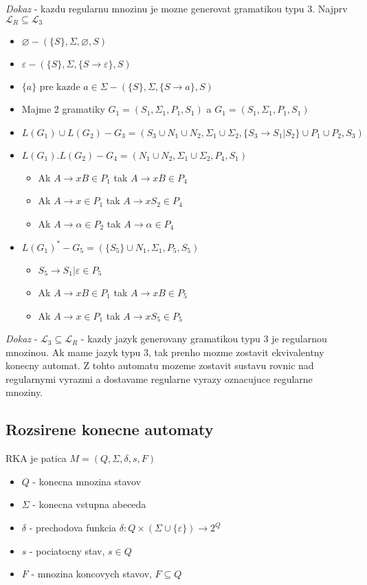 \documentclass[12pt]{article}
\begin{document}
\emph{Dokaz} - kazdu regularnu mnozinu je mozne generovat gramatikou typu 3. Najprv $\mathcal{L}_{R} \subseteq \mathcal{L}_{3}$
\begin{itemize}
	\item $\varnothing - (\{S\},\Sigma,\varnothing,S)$
	\item $\varepsilon - (\{S\},\Sigma,\{S \to \varepsilon\},S)$
	\item $\{a\}\text{ pre kazde }a \in \Sigma - (\{S\},\Sigma,\{S \to a\},S)$
	\item Majme 2 gramatiky $G_{1} = (S_{1}, \Sigma_{1}, P_{1}, S_{1})$ a $G_{1} = (S_{1}, \Sigma_{1}, P_{1}, S_{1})$
	\item $L(G_{1}) \cup L(G_{2}) - G_{3} = (S_{3} \cup N_{1} \cup N_{2}, \Sigma_{1} \cup \Sigma_{2}, \{S_{3} \to S_{1} | S_{2}\} \cup P_{1} \cup P_{2}, S_{3})$
	\item $L(G_{1}).L(G_{2}) - G_{4} = (N_{1} \cup N_{2}, \Sigma_{1} \cup \Sigma_{2}, P_{4}, S_{1})$
		\begin{itemize}
			\item Ak $A \to xB \in P_{1}$ tak $A \to xB \in P_{4}$
			\item Ak $A \to x \in P_{1}$ tak $A \to xS_{2} \in P_{4}$
			\item Ak $A \to \alpha \in P_{2}$ tak $A \to \alpha \in P_{4}$
		\end{itemize}
	\item $L(G_{1})^{*} - G_{5} = (\{S_{5}\} \cup N_{1}, \Sigma_{1}, P_{5}, S_{5})$
		\begin{itemize}
			\item $S_{5} \to S_{1}|\varepsilon \in P_{5}$
			\item Ak $A \to xB \in P_{1}$ tak $A \to xB \in P_{5}$
			\item Ak $A \to x \in P_{1}$ tak $A \to xS_{5} \in P_{5}$
		\end{itemize}
\end{itemize}

\emph{Dokaz} - $\mathcal{L}_{3} \subseteq \mathcal{L}_{R}$ - kazdy jazyk generovany gramatikou typu 3 je regularnou mnozinou.
Ak mame jazyk typu 3, tak prenho mozme zostavit ekvivalentny konecny automat. Z tohto automatu mozeme zostavit sustavu rovnic
nad regularnymi vyrazmi a dostavame regularne vyrazy oznacujuce regularne mnoziny.

\subsection*{Rozsirene konecne automaty}
RKA je patica $M = (Q, \Sigma, \delta, s, F)$
\begin{itemize}
	\item $Q$ - konecna mnozina stavov
	\item $\Sigma$ - konecna vstupna abeceda
	\item $\delta$ - prechodova funkcia $\delta: Q \times (\Sigma \cup \{\varepsilon\}) \to 2^{Q}$
	\item $s$ - pociatocny stav, $s \in Q$
	\item $F$ - mnozina koncovych stavov, $F \subseteq Q$
\end{itemize}
\end{document}

